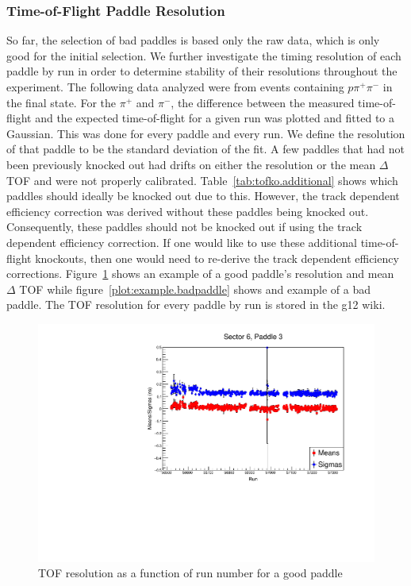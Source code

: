 \begin{v2}
\subsubsection{\label{sec:calib.tof.resolution}Time-of-Flight Paddle Resolution}
So far, the selection of bad paddles is based only the raw data, which is only good for the initial selection. We further investigate the timing resolution of each paddle by run in order to determine stability of their resolutions throughout the experiment. The following data analyzed were from events containing $p \pi^{+} \pi^{-}$ in the final state. For the $\pi^{+}$ and $\pi^{-}$, the difference between the measured time-of-flight and the expected time-of-flight for a given run was plotted and fitted to a Gaussian. This was done for every paddle and every run. We define the resolution of that paddle to be the standard deviation of the fit. 
A few paddles that had not been previously knocked out had drifts on either the resolution or the mean $\Delta$ TOF and were not properly calibrated. Table~\ref{tab:tofko.additional} shows which paddles should ideally be knocked out due to this. However, the track dependent efficiency correction was derived without these paddles being knocked out. Consequently, these paddles should not be knocked out if using the track dependent efficiency correction. If one would like to use these additional time-of-flight knockouts, then one would need to re-derive the track dependent efficiency corrections. Figure~\ref{plot:example.goodpaddle} shows an example of a good paddle's resolution and mean $\Delta$ TOF while figure~\ref{plot:example.badpaddle} shows and example of a bad paddle. The TOF resolution for every paddle by run is stored in the g12 wiki.


\begin{figure}\begin{center}
      \includegraphics[width=0.95\columnwidth]{figures/calib/tof/goodexample.pdf}
   \caption{\label{plot:example.goodpaddle}TOF resolution as a function of run number for a good paddle}
\end{center}\end{figure}


\end{v2}
